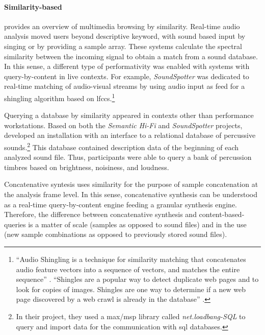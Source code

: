 \paragraph{Similarity-based}
\textcite{Frisson2015} provides an overview of multimedia browsing by similarity. Real-time audio analysis moved users beyond descriptive keyword, with sound based input by singing or by providing a sample array. These systems calculate the spectral similarity between the incoming signal to obtain a match from a sound database. In this sense, a different type of performativity was enabled with systems with query-by-content in live contexts. For example, \textit{SoundSpotter} \parencite{DBLP:conf/icmc/CaseyG07} was dedicated to real-time matching of audio-visual streams by using audio input as feed for a shingling algorithm based on \glspl{lfcc}.\footnote{``Audio Shingling is a technique for similarity matching that concatenates audio feature vectors into a sequence of vectors, and matches the entire sequence'' \parencite{DBLP:conf/icmc/CaseyG07}. ``Shingles are a popular way to detect duplicate web pages and to look for copies of images. Shingles are one way to determine if a new web page discovered by a web crawl is already in the database'' \parencite{DBLP:conf/ismir/CaseyS06}.}

Querying a database by similarity appeared in contexts other than performance workstations. Based on both the \textit{Semantic Hi-Fi} and \textit{SoundSpotter} projects, \textcite{Price2008} developed an installation with an interface to a relational database of percussive sounds.\footnote{In their project, they used a \gls{max/msp} library called \textit{net.loadbang-SQL} to query and import data for the communication with \gls{sql} databases.} This database contained description data of the beginning of each analyzed sound file. Thus, participants were able to query a bank of percussion timbres based on brightness, noisiness, and loudness. 

Concatenative syntesis uses similarity for the purpose of sample concatenation at the analysis frame level. In this sense, concatenative synthesis can be understood as a real-time query-by-content engine feeding a granular synthesis engine. Therefore, the difference between concatenative synthesis and content-based-queries is a matter of scale (samples as opposed to sound files) and in the use (new sample combinations as opposed to previously stored sound files). 


